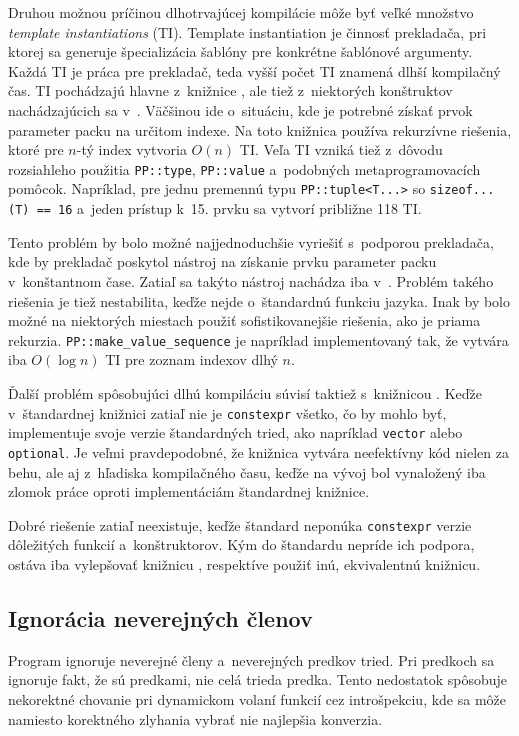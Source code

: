 Druhou možnou príčinou dlhotrvajúcej kompilácie môže byť veľké množstvo \emph{template instantiations} (TI). Template instantiation je činnosť prekladača, pri ktorej sa generuje špecializácia šablóny pre konkrétne šablónové argumenty. Kaž\-dá TI je práca pre prekladač, teda vyšší počet TI znamená dlhší kompilačný čas. TI pochádzajú hlavne z~knižnice \PP{}, ale tiež z~niektorých konštruktov nachádzajúcich sa v~\PPreflection{}. Väčšinou ide o~situáciu, kde je potrebné získať prvok parameter packu na určitom indexe. Na toto knižnica používa rekurzívne riešenia, ktoré pre $n$-tý index vytvoria $O(n)$ TI. Veľa TI vzniká tiež z~dôvodu rozsiahleho použitia \texttt{PP::type}, \texttt{PP::value} a~podobných metaprogramovacích pomôcok. Napríklad, pre jednu premennú typu \texttt{PP::tuple<T...>} so \texttt{sizeof...(T) == 16} a~jeden prístup k~15. prvku sa vytvorí približne 118 TI.

Tento problém by bolo možné najjednoduchšie vyriešiť s~podporou prekladača, kde by prekladač poskytol nástroj na získanie prvku parameter packu v~konštantnom čase. Zatiaľ sa takýto nástroj nachádza iba v~\Clang{}. Problém takého riešenia je tiež nestabilita, keďže nejde o~štandardnú funkciu jazyka. Inak by bolo možné na niektorých miestach použiť sofistikovanejšie riešenia, ako je priama rekurzia. \texttt{PP::make\_value\_sequence} je napríklad implementovaný tak, že vytvára iba $O(\log{}n)$ TI pre zoznam indexov dlhý $n$.

Ďalší problém spôsobujúci dlhú kompiláciu súvisí taktiež s~knižnicou \PP{}. Keďže v~štandardnej knižnici zatiaľ nie je \texttt{constexpr} všetko, čo by mohlo byť, \PP{} implementuje svoje verzie štandardných tried, ako napríklad \texttt{vector} alebo \texttt{optional}. Je veľmi pravdepodobné, že knižnica vytvára neefektívny kód nielen za behu, ale aj z~hľadiska kompilačného času, keďže na vývoj \PP{} bol vynaložený iba zlomok práce oproti implementáciám štandardnej knižnice.

Dobré riešenie zatiaľ neexistuje, keďže štandard neponúka \texttt{constexpr} verzie dôležitých funkcií a~konštruktorov. Kým do štandardu nepríde ich podpora, ostáva iba vylepšovať knižnicu \PP, respektíve použiť inú, ekvivalentnú knižnicu.

\subsection{Ignorácia neverejných členov}

Program ignoruje neverejné členy a~neverejných predkov tried. Pri predkoch sa ignoruje fakt, že sú predkami, nie celá trieda predka. Tento nedostatok spôsobuje nekorektné chovanie pri dynamickom volaní funkcií cez introšpekciu, kde sa môže namiesto korektného zlyhania vybrať nie najlepšia konverzia.

